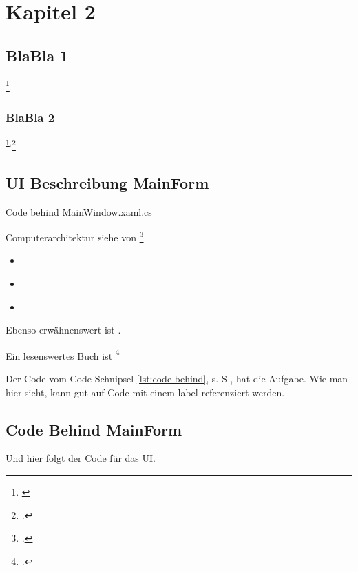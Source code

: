 \section{Kapitel 2}
	\SecAuth{\emplLastB} %

\subsection{BlaBla 1}
\blindtext[1]\footnote{\cite{Bringhurst1993}\label{xx}}

\subsubsection{BlaBla 2}
\blindtext[1]\textsuperscript{\ref{xx}}\textsuperscript{,}\footcite{wiki:latex}

\subsection{UI Beschreibung MainForm}
\blindtext[1]

\begin{longlisting}
	\caption{Code behind MainWindow.xaml.cs}	
	\label{lst:code-behind}
\end{longlisting}


Computerarchitektur siehe  von \citeauthor{Tanenbaum2006} \footcite{Tanenbaum2006}

\begin{itemize}
	\item \cite{DictLeoOrg}
	\item \cite{USAB2011}
	\item \cite{DictChemnitz}
\end{itemize}

\blindtext[2]

Ebenso erwähnenswert ist . 

Ein lesenswertes Buch ist \footcite{einstein}


Der Code vom Code Schnipsel \ref{lst:code-behind}, s. S \pageref{lst:code-behind}, hat die Aufgabe. Wie man hier sieht, kann gut auf Code mit einem label referenziert werden.

\subsection{Code Behind MainForm}
Und hier folgt der Code für das UI.

